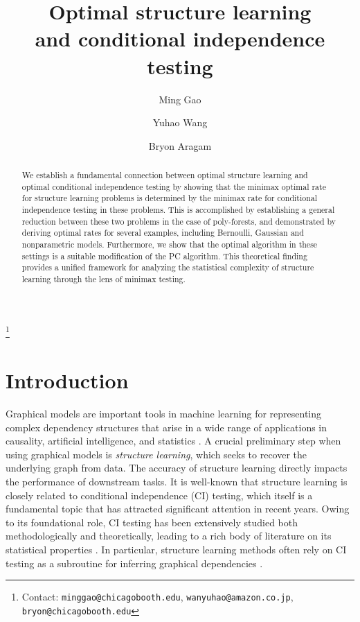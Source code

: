 \documentclass{article}
\theoremstyle{definition}
\theoremstyle{definition}
\theoremstyle{definition}
\theoremstyle{definition}
\theoremstyle{definition}
\theoremstyle{definition}
\theoremstyle{remark}
\theoremstyle{remark}
\begin{document}
\title{Optimal structure learning \\ and conditional independence testing}



\author[]{Ming Gao}
\author[]{Yuhao Wang}
\author[]{Bryon Aragam}

\date{}

\maketitle

{\let\thefootnote\relax\footnote{Contact: \texttt{minggao@chicagobooth.edu}, \texttt{wanyuhao@amazon.co.jp}, \texttt{bryon@chicagobooth.edu}}}

\begin{abstract}
    We establish a fundamental connection between optimal structure learning and optimal conditional independence testing by showing that the minimax optimal rate for structure learning problems is determined by the minimax rate for conditional independence testing in these problems. 
    This is accomplished by establishing a general reduction between these two problems in the case of poly-forests, and demonstrated by deriving optimal rates for several examples, including Bernoulli, Gaussian and nonparametric models. 
    Furthermore, we show that the optimal algorithm in these settings is a suitable modification of the PC algorithm. 
    This theoretical finding provides a unified framework for analyzing the statistical complexity of structure learning through the lens of minimax testing.
\end{abstract}

\section{Introduction}\label{sec:intro}
Graphical models are important tools in machine learning for representing complex dependency structures that arise in a wide range of applications in causality, artificial intelligence, and statistics \citep{spirtes2000causation, pearl2010causal,murphy2012machine,zhang2013integrated}.
A crucial preliminary step when using graphical models is \emph{structure learning}, which seeks to recover the underlying graph from data. The accuracy of structure learning directly impacts the performance of downstream tasks.
It is well-known that structure learning is closely related to conditional independence (CI) testing, which itself is a fundamental topic that has attracted significant attention in recent years.
Owing to its foundational role, CI testing has been extensively studied both methodologically and theoretically, leading to a rich body of literature on its statistical properties \citep{zhang2011kernel, shah2020hardness, canonne2018testing, neykov2021minimax}. 
In particular, structure learning methods often rely on CI testing as a subroutine for inferring graphical dependencies \citep{spirtes1991algorithm,maathuis2018handbook}.
\end{document}
